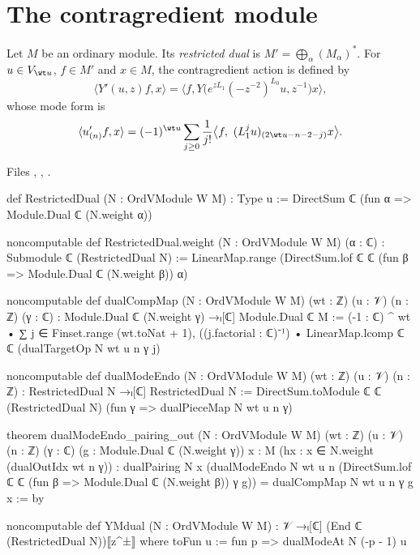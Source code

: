 \section{The contragredient module}\label{l12:sec:contra}

\begin{definition}\label{l12:def:contra}
Let $M$ be an ordinary module. Its \emph{restricted dual} is $M' = \bigoplus_\alpha(M_\alpha)^*$. For $u\in V_{\wt u}$,
$f\in M'$ and $x\in M$, the contragredient action is defined by
\begin{equation*}
 \langle Y'(u,z)f, x\rangle = \big\langle f, Y\big(e^{zL_1}(-z^{-2})^{L_0}u, z^{-1}\big)x\big\rangle ,
\end{equation*}
whose mode form is
\begin{equation*}
 \langle u'_{(n)}f, x\rangle = (-1)^{\wt u}\sum_{j\ge0}\frac1{j!}\big\langle f,\ (L_1^ju)_{(2\wt u-n-2-j)}x\big\rangle .
\end{equation*}
\end{definition}
\noindent Files ,
,
.
\begin{leancode}
def RestrictedDual (N : OrdVModule W M) : Type u := DirectSum ℂ (fun α => Module.Dual ℂ (N.weight α))

noncomputable def RestrictedDual.weight (N : OrdVModule W M) (α : ℂ) :
    Submodule ℂ (RestrictedDual N) :=
  LinearMap.range (DirectSum.lof ℂ ℂ (fun β => Module.Dual ℂ (N.weight β)) α)

noncomputable def dualCompMap (N : OrdVModule W M) (wt : ℤ) (u : 𝒱) (n : ℤ) (γ : ℂ) :
    Module.Dual ℂ (N.weight γ) →ₗ[ℂ] Module.Dual ℂ M :=
  (-1 : ℂ) ^ wt • ∑ j ∈ Finset.range (wt.toNat + 1),
    ((j.factorial : ℂ)⁻¹) • LinearMap.lcomp ℂ ℂ (dualTargetOp N wt u n γ j)

noncomputable def dualModeEndo (N : OrdVModule W M) (wt : ℤ) (u : 𝒱) (n : ℤ) :
    RestrictedDual N →ₗ[ℂ] RestrictedDual N :=
  DirectSum.toModule ℂ ℂ (RestrictedDual N) (fun γ => dualPieceMap N wt u n γ)

theorem dualModeEndo_pairing_out (N : OrdVModule W M) (wt : ℤ) (u : 𝒱) (n : ℤ) (γ : ℂ)
    (g : Module.Dual ℂ (N.weight γ)) {x : M} (hx : x ∈ N.weight (dualOutIdx wt n γ)) :
    dualPairing N x
        (dualModeEndo N wt u n
          (DirectSum.lof ℂ ℂ (fun β => Module.Dual ℂ (N.weight β)) γ g))
      = dualCompMap N wt u n γ g x := by

noncomputable def YMdual (N : OrdVModule W M) : 𝒱 →ₗ[ℂ] (End ℂ (RestrictedDual N))⟦z^±⟧ where
  toFun u := fun p => dualModeAt N (-p - 1) u
\end{leancode}

